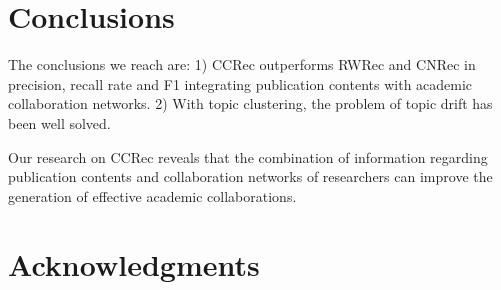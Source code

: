 \documentclass{acm_proc_article-sp}
\begin{document}
\section{Conclusions}
The conclusions we reach are: 1) CCRec outperforms RWRec and CNRec in precision, recall rate and F1 integrating publication contents with academic collaboration networks. 2) With topic clustering, the problem of topic drift has been well solved.

Our research on CCRec reveals that the combination of information regarding publication contents and collaboration networks of researchers can improve the generation of effective academic collaborations.

\section{Acknowledgments}



\balancecolumns
\end{document}
